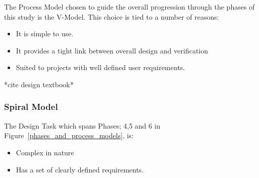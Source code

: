 The Process Model chosen to guide the overall progression through the phases of
this study is the V-Model. This choice is tied to a number of reasons: 
\begin{itemize}
    \item It is simple to use.
    \item It provides a tight link between overall design and verification 
    \item Suited to projects with well defined user requirements.
\end{itemize}

*cite design textbook*

\subsubsection{Spiral Model}
The Design Task which spans Phases; 4,5 and 6 in Figure~\ref{phases_and_process_models}, is: 
\begin{itemize}
    \item Complex in nature
    \item Has a set of clearly defined requirements. 
\end{itemize}













